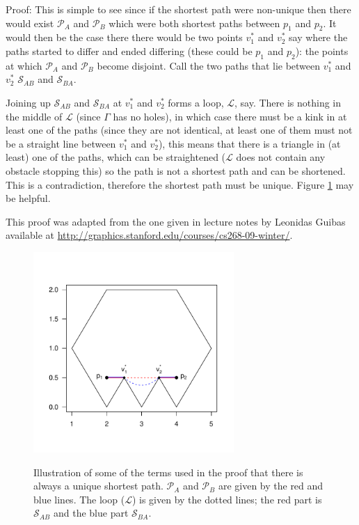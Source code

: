 Proof: This is simple to see since if the shortest path were non-unique then there would exist $\mathcal{P}_A$ and  $\mathcal{P}_B$ which were both shortest paths between $p_1$ and $p_2$. It would then be the case there there would be two points $v_1^*$ and $v_2^*$ say where the paths started to differ and ended differing (these could be $p_1$ and $p_2$): the points at which $\mathcal{P}_A$ and  $\mathcal{P}_B$ become disjoint. Call the two paths that lie between $v_1^*$ and $v_2^*$ $\mathcal{S}_{AB}$ and $\mathcal{S}_{BA}$. 

Joining up $\mathcal{S}_{AB}$ and $\mathcal{S}_{BA}$ at $v_1^*$ and $v_2^*$ forms a loop, $\mathcal{L}$, say. There is nothing in the middle of $\mathcal{L}$ (since $\Gamma$ has no holes), in which case there must be a kink in at least one of the paths (since they are not identical, at least one of them must not be a straight line between $v_1^*$ and $v_2^*$), this means that there is a triangle in (at least) one of the paths, which can be straightened ($\mathcal{L}$ does not contain any obstacle stopping this) so the path is not a shortest path and can be shortened. This is a contradiction, therefore the shortest path must be unique. Figure \ref{app-WAD-unique-dia} may be helpful.

This proof was adapted from the one given in lecture notes by Leonidas Guibas available at \url{http://graphics.stanford.edu/courses/cs268-09-winter/}.


\begin{figure}
\centering
\includegraphics[width=3in]{app-WAD/figs/unique-path-dia.pdf} \\
\caption{Illustration of some of the terms used in the proof that there is always a unique shortest path. $\mathcal{P}_A$ and  $\mathcal{P}_B$ are given by the red and blue lines. The loop ($\mathcal{L}$) is given by the dotted lines; the red part is  $\mathcal{S}_{AB}$ and the blue part  $\mathcal{S}_{BA}$.}
\label{app-WAD-unique-dia}
\end{figure}

